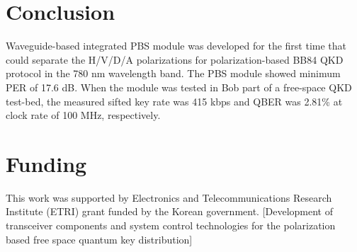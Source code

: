 \documentclass[letterpaper, 10pt]{article}
\begin{document}
\section{Conclusion}
Waveguide-based integrated PBS module was developed for the first time that could separate the H/V/D/A polarizations for polarization-based BB84 QKD protocol in the 780 nm wavelength band.
The PBS module showed minimum PER of 17.6 dB.
When the module was tested in Bob part of a free-space QKD test-bed, the measured sifted key rate was 415 kbps and QBER was 2.81\% at clock rate of 100 MHz, respectively.



\section*{Funding}
This work was supported by Electronics and Telecommunications Research Institute (ETRI) grant funded by the Korean government. [Development of transceiver components and system control technologies for the polarization based free space quantum key distribution]
\end{document}
